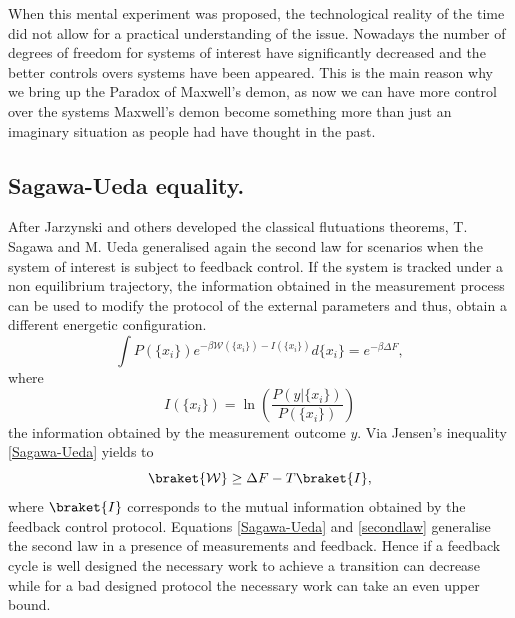 When this mental experiment was proposed, the technological reality of the time did not allow for a practical understanding of the issue. Nowadays the number of degrees of freedom for systems of interest have significantly decreased and the better controls overs systems have been appeared\cite{PhysRevB.84.245448,cite-key,PhysRevLett.109.180601}. This is the main reason why we bring up the Paradox of Maxwell's demon, as now we can have more control over the systems Maxwell's demon become something more than just an imaginary situation as people had have thought in the past.
\subsection*{Sagawa-Ueda equality.}
After Jarzynski and others developed the classical flutuations theorems, T. Sagawa and M. Ueda generalised again the second law  \cite{PhysRevLett.104.090602,Morikuni2011} for scenarios when the system of interest is subject to feedback control. If the system is tracked under a non equilibrium trajectory, the information obtained in the measurement process can be used to modify the protocol of the external parameters and thus, obtain a different energetic configuration.\\
\begin{equation}
\int P(\{x_i\})e^{-\beta \mathcal{W}(\{x_i\})-I(\{x_i\})}d\{x_i\}=e^{-\beta\Delta F},
\label{Sagawa-Ueda}
\end{equation}
where
\begin{equation}
I(\{x_i\})=\ln\left(\frac{P(y|\{x_i\})}{P(\{x_i\})}\right)
\label{information}
\end{equation}
the information obtained by the measurement outcome $y$. Via Jensen's inequality \eqref{Sagawa-Ueda} yields to
\begin{equation}
\braket{\mathcal{W}}\geq \Delta F - T \braket{I},
\label{secondlaw}
\end{equation}
where $\braket{I}$ corresponds to the mutual information obtained by the feedback control protocol. Equations \eqref{Sagawa-Ueda} and \eqref{secondlaw} generalise the second law in a presence of measurements and feedback. Hence if a feedback cycle is well designed the necessary work to achieve a transition can decrease while for a bad designed protocol the necessary work can take an even upper bound.
